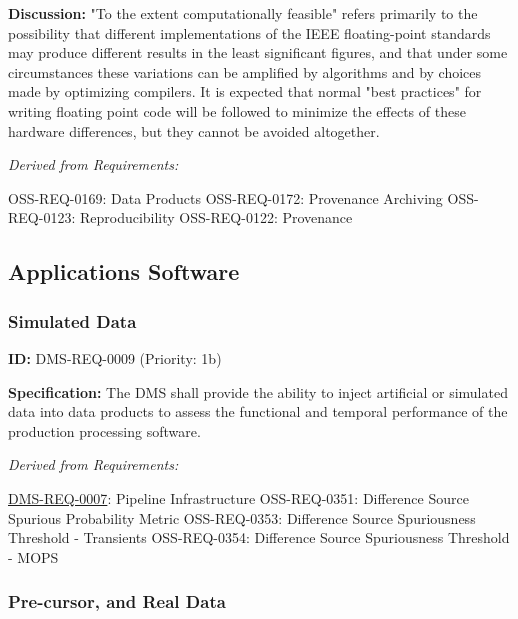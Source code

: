 \documentclass[SE,toc,lsstdraft]{lsstdoc}
\begin{document}
\textbf{Discussion:}
"To the extent computationally feasible" refers primarily to the possibility that different implementations of the IEEE floating-point standards may produce different results in the least significant figures, and that under some circumstances these variations can be amplified by algorithms and by choices made by optimizing compilers.  It is expected that normal "best practices" for writing floating point code will be followed to minimize the effects of these hardware differences, but they cannot be avoided altogether.

\emph{Derived from Requirements:}

OSS-REQ-0169:
Data Products \newline
OSS-REQ-0172:
Provenance Archiving \newline
OSS-REQ-0123:
Reproducibility \newline
OSS-REQ-0122:
Provenance \newline

\subsection{Applications Software}

\subsubsection{Simulated Data}

\label{DMS-REQ-0009}
\textbf{ID:} DMS-REQ-0009 (Priority: 1b)

\textbf{Specification:} The DMS shall provide the ability to inject artificial or simulated data into data products to assess the functional and temporal performance of the production processing software.

\emph{Derived from Requirements:}

\hyperref[DMS-REQ-0007]{DMS-REQ-0007}:
Pipeline Infrastructure \newline
OSS-REQ-0351:
Difference Source Spurious Probability Metric \newline
OSS-REQ-0353:
Difference Source Spuriousness Threshold - Transients \newline
OSS-REQ-0354:
Difference Source Spuriousness Threshold - MOPS \newline

\subsubsection{Pre-cursor, and Real Data}
\end{document}
